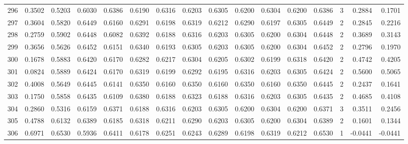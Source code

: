 \begin{tabular}{lrrrrrrrrrrrrrrr}
296 &      0.3502 &  0.5203 &  0.6030 &  0.6386 &  0.6190 &  0.6316 &  0.6203 &  0.6305 &  0.6200 &  0.6304 &   0.6200 &     0.6386 &      3 &                    0.2884 &                     0.1701 \\
297 &      0.3604 &  0.5820 &  0.6449 &  0.6160 &  0.6291 &  0.6198 &  0.6319 &  0.6212 &  0.6290 &  0.6197 &   0.6305 &     0.6449 &      2 &                    0.2845 &                     0.2216 \\
298 &      0.2759 &  0.5902 &  0.6448 &  0.6082 &  0.6392 &  0.6188 &  0.6316 &  0.6203 &  0.6305 &  0.6200 &   0.6304 &     0.6448 &      2 &                    0.3689 &                     0.3143 \\
299 &      0.3656 &  0.5626 &  0.6452 &  0.6151 &  0.6340 &  0.6193 &  0.6305 &  0.6203 &  0.6305 &  0.6200 &   0.6304 &     0.6452 &      2 &                    0.2796 &                     0.1970 \\
300 &      0.1678 &  0.5883 &  0.6420 &  0.6170 &  0.6282 &  0.6217 &  0.6304 &  0.6205 &  0.6302 &  0.6199 &   0.6318 &     0.6420 &      2 &                    0.4742 &                     0.4205 \\
301 &      0.0824 &  0.5889 &  0.6424 &  0.6170 &  0.6319 &  0.6199 &  0.6292 &  0.6195 &  0.6316 &  0.6203 &   0.6305 &     0.6424 &      2 &                    0.5600 &                     0.5065 \\
302 &      0.4008 &  0.5649 &  0.6445 &  0.6141 &  0.6350 &  0.6160 &  0.6350 &  0.6160 &  0.6350 &  0.6160 &   0.6350 &     0.6445 &      2 &                    0.2437 &                     0.1641 \\
303 &      0.1750 &  0.5858 &  0.6435 &  0.6109 &  0.6380 &  0.6188 &  0.6323 &  0.6188 &  0.6316 &  0.6203 &   0.6305 &     0.6435 &      2 &                    0.4685 &                     0.4108 \\
304 &      0.2860 &  0.5316 &  0.6159 &  0.6371 &  0.6188 &  0.6316 &  0.6203 &  0.6305 &  0.6200 &  0.6304 &   0.6200 &     0.6371 &      3 &                    0.3511 &                     0.2456 \\
305 &      0.4788 &  0.6132 &  0.6389 &  0.6185 &  0.6318 &  0.6211 &  0.6290 &  0.6203 &  0.6305 &  0.6200 &   0.6304 &     0.6389 &      2 &                    0.1601 &                     0.1344 \\
306 &      0.6971 &  0.6530 &  0.5936 &  0.6411 &  0.6178 &  0.6251 &  0.6243 &  0.6289 &  0.6198 &  0.6319 &   0.6212 &     0.6530 &      1 &                   -0.0441 &                    -0.0441 \\

\end{tabular}
